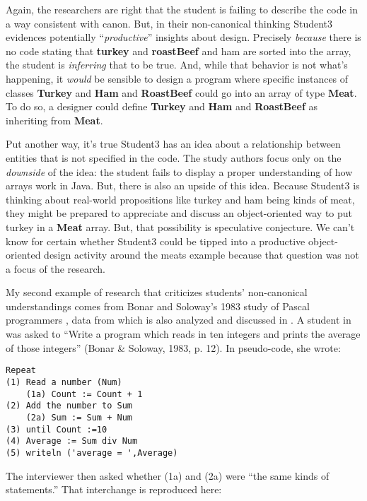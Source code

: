 Again, the researchers are right that the student is failing to describe
the code in a way consistent with canon. But, in their non-canonical thinking Student3 evidences
potentially ``\emph{productive}'' \cite{hammer_form_2002,hammer_tapping_2003} insights about design. Precisely \emph{because}
there is no code stating that \textbf{turkey} and \textbf{roastBeef} and
ham are sorted into the array, the student is \emph{inferring} that to
be true. And, while that behavior is not what's happening, it
\emph{would} be sensible to design a program where specific instances of
classes \textbf{Turkey} and \textbf{Ham} and \textbf{RoastBeef} could go
into an array of type \textbf{Meat}. To do so, a designer could define
\textbf{Turkey} and \textbf{Ham} and \textbf{RoastBeef} as inheriting
from \textbf{Meat}.

Put another way, it's true Student3 has an idea about a relationship between entities that
is not specified in the code. The study authors focus only on the \emph{downside} of the idea: the
student fails to display a proper understanding of how arrays work in
Java. But, there
is also an upside of this idea. Because Student3 is thinking about
real-world propositions like turkey and ham being kinds of meat, they
might be prepared to appreciate and discuss an object-oriented way to
put turkey in a \textbf{Meat} array. But, that possibility is
speculative conjecture. We can't know for certain whether Student3 could
be tipped into a productive object-oriented design activity around the
meats example because that question was not a focus of the research.

My second example of research that criticizes students' non-canonical
understandings comes from Bonar and Soloway's 1983 study of Pascal
programmers \cite{bonar_uncovering_1983}, data from which is also analyzed and discussed in \cite{pea_languageindependent_1986}. A student in
\cite{bonar_uncovering_1983} was asked to ``Write a program which reads in
ten integers and prints the average of those integers'' (Bonar \&
Soloway, 1983, p. 12). In pseudo-code, she wrote:

\begin{verbatim}
Repeat
(1) Read a number (Num)
    (1a) Count := Count + 1
(2) Add the number to Sum
    (2a) Sum := Sum + Num
(3) until Count :=10
(4) Average := Sum div Num
(5) writeln ('average = ',Average)
\end{verbatim}

The interviewer then asked whether (1a) and (2a) were ``the same kinds
of statements.'' That interchange is reproduced here:

